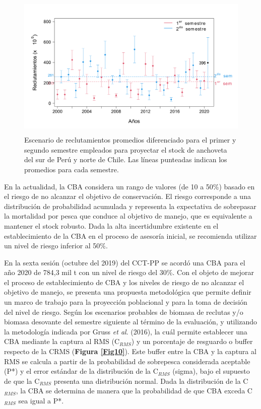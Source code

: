 \documentclass[letter,11pt]{article}
\begin{document}
\vspace{0.5cm}
\begin{figure}[htb!]
 \centering
 \includegraphics[width=14cm,height=7cm]{Figuras/figura9.pdf}
 \caption{Escenario de reclutamientos promedios diferenciado para el primer y segundo semestre empleados para proyectar el stock de anchoveta del sur de Per\'u y norte de Chile. Las l\'ineas punteadas indican los promedios para cada semestre.}
 \label{Fig9}
\end{figure}

En la actualidad, la CBA considera un rango de valores (de 10 a 50\%)
basado en el riesgo de no alcanzar el objetivo de conservaci\'on. El
riesgo corresponde a una distribuci\'on de probabilidad acumulada y
representa la expectativa de sobrepasar la mortalidad por pesca que
conduce al objetivo de manejo, que es equivalente a mantener el stock
robusto. Dada la alta incertidumbre existente en el establecimiento de
la CBA en el proceso de asesor\'ia inicial, se recomienda utilizar un
nivel de riesgo inferior al 50\%.

En la sexta sesi\'on (octubre del 2019) del CCT-PP se acord\'o una CBA para
el a\~{n}o 2020 de 784,3 mil t con un nivel de riesgo del 30\%. Con el
objeto de mejorar el proceso de establecimiento de CBA y los niveles de
riesgo de no alcanzar el objetivo de manejo, se presenta una propuesta
metodol\'ogica que permite definir un marco de trabajo para la proyecci\'on
poblacional y para la toma de decisi\'on del nivel de riesgo. Seg\'un los
escenarios probables de biomasa de reclutas y/o biomasa desovante del
semestre siguiente al t\'ermino de la evaluaci\'on, y utilizando la
metodolog\'ia indicada por Gruss \textit{et al}. (2016), la cu\'al permite
establecer una CBA mediante la captura al RMS (C$_{RMS}$) y un
porcentaje de resguardo o buffer respecto de la CRMS
(\textbf{Figura \ref{Fig10}}). Este buffer entre la CBA y la captura al
RMS se calcula a partir de la probabilidad de sobrepesca considerada
aceptable (P*) y el error est\'andar de la distribuci\'on de la C$_{RMS}$
(sigma), bajo el supuesto de que la C$_{RMS}$ presenta una
distribuci\'on normal. Dada la distribuci\'on de la C$_{RMS}$, la CBA se
determina de manera que la probabilidad de que CBA exceda C$_{RMS}$
sea igual a P*.
\end{document}
